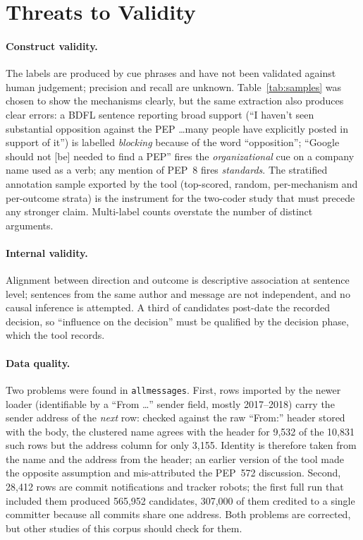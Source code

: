 \documentclass[sigconf,screen]{acmart}
\begin{document}
\section{Threats to Validity}
\label{sec:threats}

\paragraph{Construct validity.} The labels are produced by cue phrases and have not been validated against human judgement; precision and recall are unknown. Table~\ref{tab:samples} was chosen to show the mechanisms clearly, but the same extraction also produces clear errors: a BDFL sentence reporting broad support (``I haven't seen substantial opposition against the PEP \ldots many people have explicitly posted in support of it'') is labelled \emph{blocking} because of the word ``opposition''; ``Google should not [be] needed to find a PEP'' fires the \emph{organizational} cue on a company name used as a verb; any mention of PEP~8 fires \emph{standards}. The stratified annotation sample exported by the tool (top-scored, random, per-mechanism and per-outcome strata) is the instrument for the two-coder study that must precede any stronger claim. Multi-label counts overstate the number of distinct arguments.

\paragraph{Internal validity.} Alignment between direction and outcome is descriptive association at sentence level; sentences from the same author and message are not independent, and no causal inference is attempted. A third of candidates post-date the recorded decision, so ``influence on the decision'' must be qualified by the decision phase, which the tool records.

\paragraph{Data quality.} Two problems were found in \texttt{allmessages}. First, rows imported by the newer loader (identifiable by a ``From \ldots'' sender field, mostly 2017--2018) carry the sender address of the \emph{next} row: checked against the raw ``From:'' header stored with the body, the clustered name agrees with the header for 9,532 of the 10,831 such rows but the address column for only 3,155. Identity is therefore taken from the name and the address from the header; an earlier version of the tool made the opposite assumption and mis-attributed the PEP~572 discussion. Second, 28,412 rows are commit notifications and tracker robots; the first full run that included them produced 565,952 candidates, 307,000 of them credited to a single committer because all commits share one address. Both problems are corrected, but other studies of this corpus should check for them.
\end{document}
